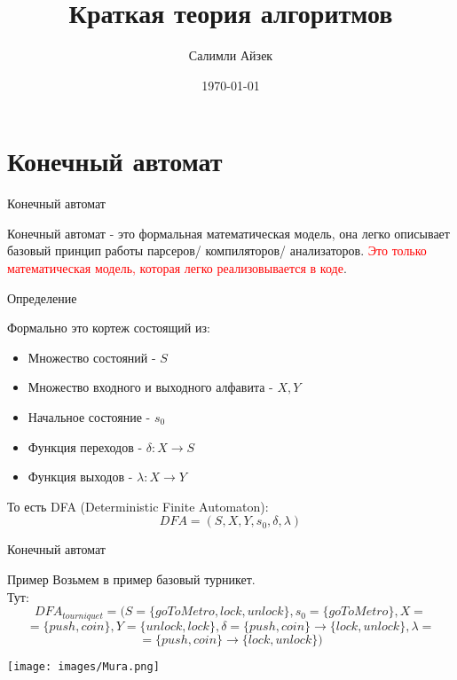 \documentclass{beamer}
\title[КТА]{Краткая теория алгоритмов}
\author{Салимли Айзек}
\institute{MathLang}
\date{\today}
\newenvironment{rusdefinition}[1][Определение]{
    \begin{block}{#1}
}{\end{block}}
\newenvironment{rexample}[1][Пример]{\begin{exampleblock}{#1}}{\end{exampleblock}}
\begin{document}
\begin{frame}
    \titlepage
\end{frame}


\section{Конечный автомат}
\begin{frame}{Конечный автомат}

Конечный автомат - это формальная математическая модель, она легко описывает базовый принцип работы парсеров/ компиляторов/ анализаторов. 
\textcolor{red}{Это только математическая модель, которая легко реализовывается в коде}. \\
\begin{rusdefinition}
Формально это кортеж состоящий из:
\begin{itemize}
    \item Множество состояний - $S$
    \item Множество входного и выходного алфавита - $X, Y$ 
    \item Начальное состояние - $s_0$
    \item Функция переходов - $\delta : X \rightarrow S$
    \item Функция выходов - $\lambda : X \rightarrow Y$ 
\end{itemize}
\end{rusdefinition}
То есть DFA (Deterministic Finite Automaton): 
\[ DFA = (S, X, Y, s_0, \delta, \lambda) \]
\end{frame}

\begin{frame}{Конечный автомат}
    \begin{rexample}
    Возьмем в пример базовый турникет. \\
    Тут: 
    \[ DFA_{tourniquet} = (S = \{ goToMetro, lock, unlock\}, s_0 = \{goToMetro\}, X = \]
    \[ = \{push, coin\}, Y = \{unlock, lock\}, \delta = \{ push, coin\} \rightarrow \{lock, unlock\}, \lambda = \]
    \[ = \{ push, coin\} \rightarrow \{ lock, unlock \}) \]
        \begin{centering}
            \texttt{[image: images/Mura.png]}
        \end{centering}
    \end{rexample}
\end{frame}
\end{document}

